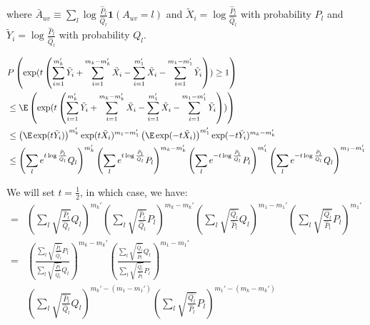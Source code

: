 \documentclass{article}
\begin{document}
where $\bar{A}_{uv} \equiv \sum_l \log \frac{\hat{P}_l}{\hat{Q}_l} \mathbf{1}(A_{uv} = l)$ and $\tilde{X}_i = \log \frac{\hat{P}_l}{\hat{Q}_l}$ with probability $P_l$ and $\tilde{Y}_i = \log \frac{\hat{P}_l}{\hat{Q}_l}$ with probability $Q_l$. 



\begin{align*}
& P \left( \exp( t \left( \sum_{i=1}^{m_k'} \tilde{Y}_i + \sum_{i=1}^{m_k - m_k'} \tilde{X}_i- 
     \sum_{i=1}^{m_1'}  \tilde{X}_i - \sum_{i=1}^{m_1 - m_1'} \tilde{Y}_i  \right) ) \geq 1 \right) \\ 
&\leq \E \left( 
\exp( t \left( \sum_{i=1}^{m_k'} \tilde{Y}_i + \sum_{i=1}^{m_k - m_k'} \tilde{X}_i - 
     \sum_{i=1}^{m_1'}  \tilde{X}_i - \sum_{i=1}^{m_1 - m_1'} \tilde{Y}_i  \right) )
 \right) \\ 
&\leq \left( \E \exp( t \tilde{Y}_i ) \right)^{m_k'} \exp(t \tilde{X}_i )^{m_1 - m_1'}  
    \left( \E \exp( - t \tilde{X}_i) \right)^{m_1'} \exp( -t \tilde{Y}_i )^{m_k - m_k'} \\
&\leq \left( \sum_l e^{t \log \frac{\hat{P}_l}{\hat{Q}_l} } Q_l \right)^{m_k'}  
      \left( \sum_l e^{t \log \frac{\hat{P}_l}{\hat{Q}_l}} P_l \right)^{m_k - m_k'} 
      \left( \sum_l e^{- t \log \frac{\hat{P}_l}{\hat{Q_l}} } P_l \right)^{m_1'}
     \left( \sum_l e^{-t \log \frac{\hat{P}_l}{\hat{Q}_l}} Q_l \right)^{m_1 - m_1'}
\end{align*}

We will set $t = \frac{1}{2}$, in which case, we have:
\begin{align}
=& \left( \sum_l \sqrt{\frac{\hat{P}_l}{\hat{Q}_l} } Q_l \right)^{m_k'}
 \left( \sum_l \sqrt{\frac{\hat{P}_l}{\hat{Q}_l} } P_l \right)^{m_k - m_k'}
 \left( \sum_l \sqrt{\frac{\hat{Q}_l}{\hat{P}_l} } Q_l \right)^{m_1 - m_1'}
       \left( \sum_l \sqrt{\frac{\hat{Q_l}}{\hat{P}_l} } P_l \right)^{m_1'} \nonumber \\
=&  \left( \frac{\sum_l \sqrt{\frac{\hat{P}_l}{\hat{Q}_l} } P_l}
                {\sum_l \sqrt{\frac{\hat{P}_l}{\hat{Q}_l} } Q_l}  \right)^{m_k - m_k'}
 \left( \frac{ \sum_l \sqrt{\frac{\hat{Q}_l}{\hat{P}_l} } Q_l}
             { \sum_l \sqrt{\frac{\hat{Q}_l}{\hat{P}_l} } P_l} \right)^{m_1 - m_1'}  
   \label{eqn:excess_error_term} \\
 & \left( \sum_l \sqrt{ \frac{\hat{P}_l}{\hat{Q}_l}} Q_l \right)^{m_k' - (m_1 - m_1')} 
    \left( \sum_l \sqrt{\frac{\hat{Q_l}}{\hat{P}_l} } P_l \right)^{m_1' - (m_k - m_k')}
   \label{eqn:Ihat_error_term} 
\end{align} 
\end{document}
